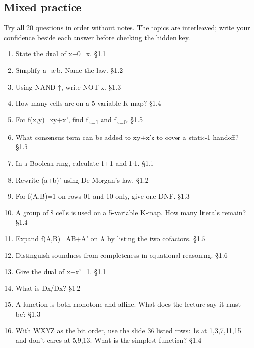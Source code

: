 \documentclass[11pt]{article}
\begin{document}
\clearpage

\begin{keepsection}
\section{Mixed practice}

Try all 20 questions in order without notes. The topics are interleaved; write your confidence beside each answer before checking the hidden key.

\begin{enumerate}
\item State the dual of x+0=x. \hfill{\small\color{FAUblue}§1.1}
\item Simplify a+a\ensuremath{\cdot}b. Name the law. \hfill{\small\color{FAUblue}§1.2}
\item Using NAND ↑, write NOT x. \hfill{\small\color{FAUblue}§1.3}
\item How many cells are on a 5-variable K-map? \hfill{\small\color{FAUblue}§1.4}
\item For f(x,y)=xy+x', find f\textsubscript{x=1} and f\textsubscript{x=0}. \hfill{\small\color{FAUblue}§1.5}
\item What consensus term can be added to xy+x'z to cover a static-1 handoff? \hfill{\small\color{FAUblue}§1.6}
\item In a Boolean ring, calculate 1+1 and 1\ensuremath{\cdot}1. \hfill{\small\color{FAUblue}§1.1}
\item Rewrite (a+b)' using De Morgan’s law. \hfill{\small\color{FAUblue}§1.2}
\item For f(A,B)=1 on rows 01 and 10 only, give one DNF. \hfill{\small\color{FAUblue}§1.3}
\item A group of 8 cells is used on a 5-variable K-map. How many literals remain? \hfill{\small\color{FAUblue}§1.4}
\item Expand f(A,B)=AB+A' on A by listing the two cofactors. \hfill{\small\color{FAUblue}§1.5}
\item Distinguish soundness from completeness in equational reasoning. \hfill{\small\color{FAUblue}§1.6}
\item Give the dual of x+x'=1. \hfill{\small\color{FAUblue}§1.1}
\item What is Dx/Dx? \hfill{\small\color{FAUblue}§1.2}
\item A function is both monotone and affine. What does the lecture say it must be? \hfill{\small\color{FAUblue}§1.3}
\item With WXYZ as the bit order, use the slide 36 listed rows: 1s at 1,3,7,11,15 and don’t-cares at 5,9,13. What is the simplest function? \hfill{\small\color{FAUblue}§1.4}

\end{enumerate}
\end{keepsection}
\end{document}

